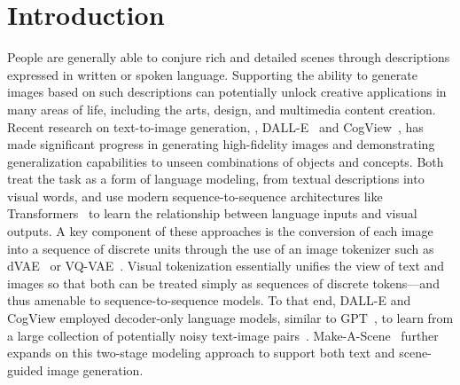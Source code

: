 

\section{Introduction}

People are generally able to conjure rich and detailed scenes through descriptions expressed in written or spoken language. Supporting the ability to generate images based on such descriptions can potentially unlock creative applications in many areas of life, including the arts, design, and multimedia content creation. Recent research on text-to-image generation, \eg, DALL-E~\cite{ramesh2021zero} and CogView~\cite{ding2021cogview}, has made significant progress in generating high-fidelity images and demonstrating generalization capabilities to unseen combinations of objects and concepts. Both treat the task as a form of language modeling, from textual descriptions into visual words, and use modern sequence-to-sequence architectures like Transformers~\cite{vaswani2017attention} to learn the relationship between language inputs and visual outputs. A key component of these approaches is the conversion of each image into a sequence of discrete units through the use of an image tokenizer such as dVAE~\cite{rolfe2016discrete} or VQ-VAE~\cite{van2017neural}. Visual tokenization essentially unifies the view of text and images so that both can be treated simply as sequences of discrete tokens---and thus amenable to sequence-to-sequence models. To that end, DALL-E and CogView employed decoder-only language models, similar to GPT~\cite{radford2018improving}, to learn from a large collection of potentially noisy text-image pairs~\cite{changpinyo2021cc12m, align-paper}. Make-A-Scene~\cite{gafni2022make} further expands on this two-stage modeling approach to support both text and scene-guided image generation.

